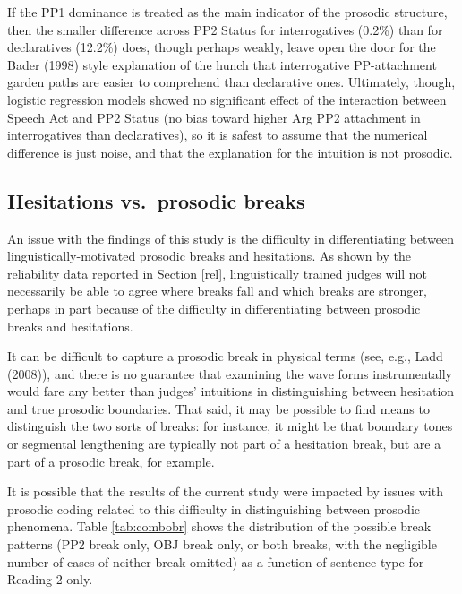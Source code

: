 \documentclass[11pt,oneside]{book}
\begin{document}
If the PP1 dominance is treated as the main indicator of the prosodic structure, then the smaller difference across PP2 Status for interrogatives (0.2\%) than for declaratives (12.2\%) does, though perhaps weakly, leave open the door for the Bader (1998) style explanation of the hunch that interrogative PP-attachment garden paths are easier to comprehend than declarative ones. Ultimately, though, logistic regression models showed no significant effect of the interaction between Speech Act and PP2 Status (no bias toward higher Arg PP2 attachment in interrogatives than declaratives), so it is safest to assume that the numerical difference is just noise, and that the explanation for the intuition is not prosodic.

\hypertarget{hesi}{%
\subsection{Hesitations vs.~prosodic breaks}\label{hesi}}

An issue with the findings of this study is the difficulty in differentiating between linguistically-motivated prosodic breaks and hesitations. As shown by the reliability data reported in Section \ref{rel}, linguistically trained judges will not necessarily be able to agree where breaks fall and which breaks are stronger, perhaps in part because of the difficulty in differentiating between prosodic breaks and hesitations.

It can be difficult to capture a prosodic break in physical terms (see, e.g., Ladd (2008)), and there is no guarantee that examining the wave forms instrumentally would fare any better than judges' intuitions in distinguishing between hesitation and true prosodic boundaries. That said, it may be possible to find means to distinguish the two sorts of breaks: for instance, it might be that boundary tones or segmental lengthening are typically not part of a hesitation break, but are a part of a prosodic break, for example.

It is possible that the results of the current study were impacted by issues with prosodic coding related to this difficulty in distinguishing between prosodic phenomena. Table \ref{tab:combobr} shows the distribution of the possible break patterns (PP2 break only, OBJ break only, or both breaks, with the negligible number of cases of neither break omitted) as a function of sentence type for Reading 2 only.
\end{document}
